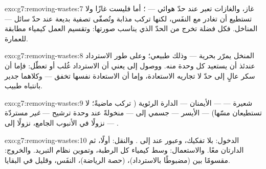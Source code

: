 \begin{solution}{exo:g7:removing-wastes:7}
 غاز، والغازات تعبر عند حدّ هوائي --- ؛
أما  فليست غازًا ولا تستطيع أن تغادر مع النفَس، لكنها تركب
مذابة وتُصفّى تصفية بديعة عند حدّ سائل --- المناخل. فكل فضلة تخرج
من الحدّ الذي يناسب صورتها: وتقسيم العمل كيمياء مطابقة للعمارة.
\end{solution}

\begin{solution}{exo:g7:removing-wastes:8}
المنخل يمرّر  بحرية --- وذلك طبيعي؛ وعلى طور الاسترداد
عندئذ أن يستعيد كل وحدة منه. ووصول  إلى  يعني أن
الاسترداد غُلب أو تعطّل: فإما أن سكر  عالٍ إلى حدّ لا تجاريه
الاستعادة، وإما أن الاستعادة نفسها تخفق --- وكلاهما جدير بانتباه
طبيب.
\end{solution}

\begin{solution}{exo:g7:removing-wastes:9}
شعيرة  ---  ---   الأيمنان --- الدارة
الرئوية ( تركب ماضيةً؛  لا تستطيعان مسّها) ---
 الأيسر ---  جسمي إلى  --- منخولةً عند وحدة ترشيح
--- \emph{غير} مستردّة --- نزولًا في الأنبوب الجامع، نزولًا إلى
.
\end{solution}

\begin{solution}{exo:g7:removing-wastes:10}
الدخول: بلا تفكيك، وعبور عند  إلى . والنقل: 
أولًا، ثم الدارتان معًا. والاستعمال: وسط كيمياء كل  الرطبة،
وتموين نظام التبريد. والخروج: مقسومًا بين  (مضبوطًا
بالاسترداد)،  (حصة الرياضة)،  النفَس، وقليل في
البقايا.
\end{solution}

